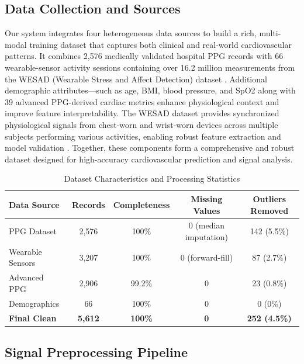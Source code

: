 \documentclass[3p,times,procedia]{elsarticle}
\begin{document}
\subsection{{Data Collection and Sources}}
\vspace{-2pt}
Our system integrates four heterogeneous data sources to build a rich, multi-modal training dataset that captures both clinical and real-world cardiovascular patterns. It combines 2,576 medically validated hospital PPG records with 66 wearable-sensor activity sessions containing over 16.2 million measurements from the WESAD (Wearable Stress and Affect Detection) dataset \cite{wesad2018,wesad2018kaggle}. Additional demographic attributes—such as age, BMI, blood pressure, and SpO2 along with 39 advanced PPG-derived cardiac metrics enhance physiological context and improve feature interpretability. The WESAD dataset provides synchronized physiological signals from chest-worn and wrist-worn devices across multiple subjects performing various activities, enabling robust feature extraction and model validation \cite{wesad2018github}. Together, these components form a comprehensive and robust dataset designed for high-accuracy cardiovascular prediction and signal analysis.

\begin{table}[h]
\centering
\begin{tabular}{|l|c|c|c|c|}
\hline
\rowcolor{gray!20}
\textbf{Data Source} & \textbf{Records} & \textbf{Completeness} & \textbf{Missing Values} & \textbf{Outliers Removed} \\
\hline
PPG Dataset & 2,576 & 100\% & 0 (median imputation) & 142 (5.5\%) \\
\rowcolor{gray!10}
Wearable Sensors & 3,207 & 100\% & 0 (forward-fill) & 87 (2.7\%) \\
Advanced PPG & 2,906 & 99.2\% & 0 & 23 (0.8\%) \\
\rowcolor{gray!10}
Demographics & 66 & 100\% & 0 & 0 (0\%) \\
\hline
\rowcolor{gray!20}
\textbf{Final Clean} & \textbf{5,612} & \textbf{100\%} & \textbf{0} & \textbf{252 (4.5\%)} \\
\hline
\end{tabular}

\caption{Dataset Characteristics and Processing Statistics}
\end{table}


\subsection{{Signal Preprocessing Pipeline}}
\vspace{-2pt}
\end{document}
